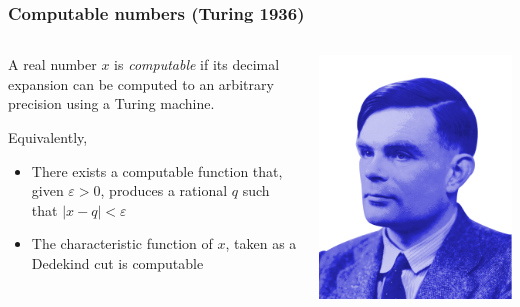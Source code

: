 \documentclass{beamer}
\begin{document}
\begin{frame}
    \frametitle{Computable numbers (Turing 1936)}
    \begin{columns}
        \begin{column}{.75\textwidth}
            A real number $x$ is \textit{computable} if its decimal expansion can be computed to an arbitrary precision using a Turing machine.

            \vspace{2em}
            Equivalently,
            \begin{itemize}
                \item There exists a computable function that, given $\varepsilon >0$, produces a rational $q$ such that $|x-q| < \varepsilon$
                \item The characteristic function of $x$, taken as a Dedekind cut is computable
            \end{itemize}
        \end{column}
        \begin{column}{.25\textwidth}
            \includegraphics[height=.25\textheight]{images/Turing.png}
            \vfill
        \end{column}
    \end{columns}
\end{frame}
\end{document}
